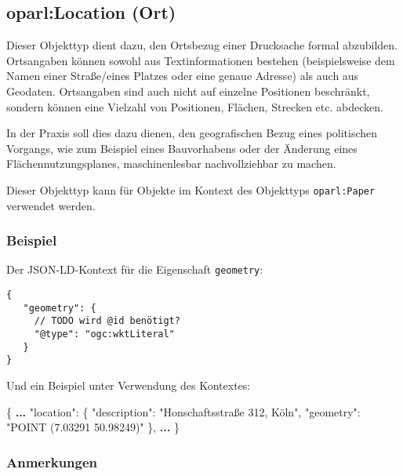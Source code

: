 \documentclass[,a4paper]{article}
\newenvironment{Shaded}{}{}
\newcommand{\DataTypeTok}[1]{\textcolor[rgb]{0.56,0.13,0.00}{{#1}}}
\newcommand{\StringTok}[1]{\textcolor[rgb]{0.25,0.44,0.63}{{#1}}}
\newcommand{\FunctionTok}[1]{\textcolor[rgb]{0.02,0.16,0.49}{{#1}}}
\newcommand{\ErrorTok}[1]{\textcolor[rgb]{1.00,0.00,0.00}{\textbf{{#1}}}}
\begin{document}
\subsection{oparl:Location (Ort)}\label{oparlux5flocation}

Dieser Objekttyp dient dazu, den Ortsbezug einer Drucksache formal
abzubilden. Ortsangaben können sowohl aus Textinformationen bestehen
(beispielsweise dem Namen einer Straße/eines Platzes oder eine genaue
Adresse) als auch aus Geodaten. Ortsangaben sind auch nicht auf einzelne
Positionen beschränkt, sondern können eine Vielzahl von Positionen,
Flächen, Strecken etc. abdecken.

In der Praxis soll dies dazu dienen, den geografischen Bezug eines
politischen Vorgangs, wie zum Beispiel eines Bauvorhabens oder der
Änderung eines Flächennutzungsplanes, maschinenlesbar nachvollziehbar zu
machen.

Dieser Objekttyp kann für Objekte im Kontext des Objekttyps
\texttt{oparl:Paper} verwendet werden.

\subsubsection{Beispiel}\label{beispiel-9}

Der JSON-LD-Kontext für die Eigenschaft \texttt{geometry}:

\begin{verbatim}
{
   "geometry": {
     // TODO wird @id benötigt?
     "@type": "ogc:wktLiteral"
   }
}
\end{verbatim}

Und ein Beispiel unter Verwendung des Kontextes:

\begin{Shaded}
\begin{Highlighting}[]
\FunctionTok{\{}
    \ErrorTok{...}
    \DataTypeTok{"location"}\FunctionTok{:} \FunctionTok{\{}
        \DataTypeTok{"description"}\FunctionTok{:} \StringTok{"Honschaftsstraße 312, Köln"}\FunctionTok{,}
        \DataTypeTok{"geometry"}\FunctionTok{:} \StringTok{"POINT (7.03291 50.98249)"}
    \FunctionTok{\},}
    \ErrorTok{...}
\FunctionTok{\}}
\end{Highlighting}
\end{Shaded}

\subsubsection{Anmerkungen}\label{anmerkungen-3}
\end{document}

